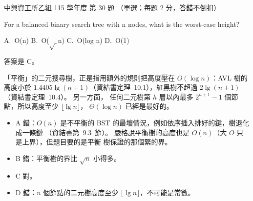 \begin{pastexam}[label={px:nchu-115-is-30}]{中興資工所乙組 115 學年度 第 30 題}
（單選；每題 2 分，答錯不倒扣）

For a balanced binary search tree with n nodes, what is the worst-case height?

A.~O(n) \qquad B.~O($\sqrt{\ }$n) \qquad C.~O(log n) \qquad D.~O(1)
\end{pastexam}

\begin{pastsoln}
答案是 C。

「平衡」的二元搜尋樹，正是指用額外的規則把高度壓在 $O(\log n)$：AVL 樹的高度小於
$1.4405\lg(n + 1)$（資結書定理~10.1），紅黑樹不超過 $2\lg(n + 1)$（資結書定理~10.4）。 另一方面，
任何二元樹第 $h$ 層以內最多 $2^{h+1} - 1$ 個節點，所以高度至少 $\lfloor \lg n \rfloor$，
$\Theta(\log n)$ 已經是最好的。
\begin{itemize}
\item A 錯：$O(n)$ 是不平衡的 BST 的最壞情況，例如依序插入排好的鍵，樹退化成一條鏈
（資結書第~9.3~節）。 嚴格說平衡樹的高度也是 $O(n)$（大 $O$ 只是上界），但題目要的是平衡
樹保證的那個緊的界。
\item B 錯：平衡樹的界比 $\sqrt{n}$ 小得多。
\item C 對。
\item D 錯：$n$ 個節點的二元樹高度至少 $\lfloor \lg n \rfloor$，不可能是常數。
\end{itemize}
\end{pastsoln}
